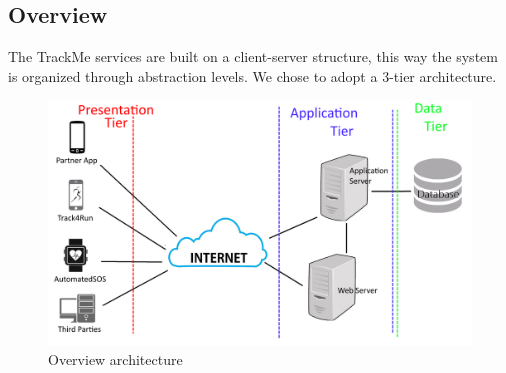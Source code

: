 \subsection{Overview}
The TrackMe services are built on a client-server structure, this way the system is organized through abstraction levels.
We chose to adopt a 3-tier architecture.
\\[0.2cm]
\begin{figure}[H]
\centering
\includegraphics[scale=0.18]{Images/Overview.png}
\caption{Overview architecture }
\end{figure}

